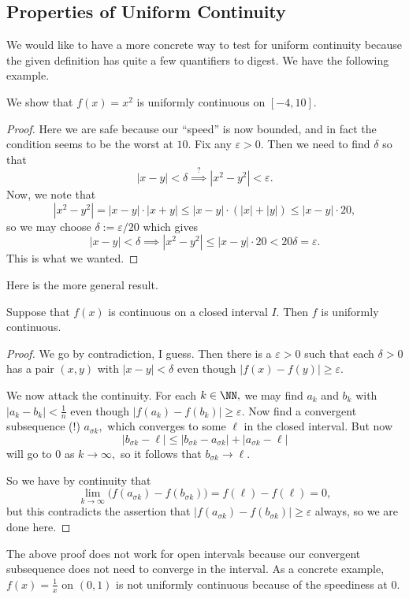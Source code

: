 \documentclass[../notes.tex]{subfiles}
\begin{document}
\subsection{Properties of Uniform Continuity}
We would like to have a more concrete way to test for uniform continuity because the given definition has quite a few quantifiers to digest. We have the following example.
\begin{exercise}
	We show that $f(x)=x^2$ is uniformly continuous on $[-4,10].$
\end{exercise}
\begin{proof}
	Here we are safe because our ``speed'' is now bounded, and in fact the condition seems to be the worst at $10.$ Fix any $\varepsilon>0.$ Then we need to find $\delta$ so that
	\[|x-y|<\delta\stackrel?\implies\left|x^2-y^2\right|<\varepsilon.\]
	Now, we note that
	\[\left|x^2-y^2\right|=|x-y|\cdot|x+y|\le|x-y|\cdot(|x|+|y|)\le|x-y|\cdot20,\]
	so we may choose $\delta:=\varepsilon/20$ which gives
	\[|x-y|<\delta\implies\left|x^2-y^2\right|\le|x-y|\cdot20<20\delta=\varepsilon.\]
	This is what we wanted.
\end{proof}
Here is the more general result.
\begin{theorem}
	Suppose that $f(x)$ is continuous on a closed interval $I.$ Then $f$ is uniformly continuous.
\end{theorem}
\begin{proof}
	We go by contradiction, I guess. Then there is a $\varepsilon>0$ such that each $\delta>0$ has a pair $(x,y)$ with $|x-y|<\delta$ even though $|f(x)-f(y)|\ge\varepsilon.$

	We now attack the continuity. For each $k\in\NN,$ we may find $a_k$ and $b_k$ with $|a_k-b_k|<\frac1n$ even though $|f(a_k)-f(b_k)|\ge\varepsilon.$ Now find a convergent subsequence (!) $a_{\sigma k},$ which converges to some $\ell$ in the closed interval. But now
	\[|b_{\sigma k}-\ell|\le|b_{\sigma k}-a_{\sigma k}|+|a_{\sigma k}-\ell|\]
	will go to $0$ as $k\to\infty,$ so it follows that $b_{\sigma k}\to\ell.$

	So we have by continuity that
	\[\lim_{k\to\infty}\big(f(a_{\sigma k})-f(b_{\sigma k})\big)=f(\ell)-f(\ell)=0,\]
	but this contradicts the assertion that $|f(a_{\sigma k})-f(b_{\sigma k})|\ge\varepsilon$ always, so we are done here.
\end{proof}
\begin{remark}
	The above proof does not work for open intervals because our convergent subsequence does not need to converge in the interval. As a concrete example, $f(x)=\frac1x$ on $(0,1)$ is not uniformly continuous because of the speediness at $0.$
\end{remark}
\end{document}
